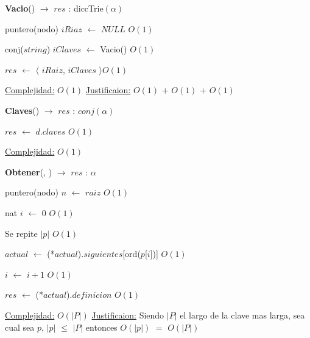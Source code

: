 \begin{Algoritmos}
  
  
\begin{algorithm}[H]
{\textbf{Vacio}() $\to$ $res$ : diccTrie$(\alpha)$}
\begin{algorithmic}[1]

\State puntero(nodo) $iRiaz$ $\gets $ $NULL$  \Comment $O(1)$
 
\State conj($string$) $iClaves$ $\gets$ Vacio() \Comment $O(1)$

\State $res$ $\gets$  $\langle$ $iRaiz$, $iClaves$ $\rangle$\Comment $O(1)$

\medskip
\State \underline{Complejidad:} $O(1)$
\State \underline{Justificaion:} $O(1)$ $+$ $O(1)$ $+$ $O(1)$

\end{algorithmic}
\end{algorithm}  

\begin{algorithm}[H]
{\textbf{Claves}(}) $\to$ $res$ : $conj(\alpha)$
\begin{algorithmic}[1]

\State $res$ $\gets$ $d$.$claves$ \Comment $O(1)$

\medskip
\State \underline{Complejidad:} $O(1)$

\end{algorithmic}
\end{algorithm}
  
  
  
\begin{algorithm}[H]
{\textbf{Obtener}(, }) $\to$ $res$ : $\alpha$
\begin{algorithmic}[1]

\State puntero(nodo) $n$ $\gets$ $raiz$ \Comment $O(1)$

\State nat $i$ $\gets$ $0$ \Comment $O(1)$


   \Comment Se repite $|p|$ $O(1)$
		

	\State $actual$ $\gets$ (*$actual$).$siguientes$[ord($p$[$i$])] \Comment $O(1)$

	\State $i$ $\gets$ $i + 1$ \Comment $O(1)$
\EndWhile 


\State $res$ $\gets$ (*$actual$).$definicion$ \Comment $O(1)$ 

\medskip
\State \underline{Complejidad:} $O(|P|)$
\State \underline{Justificaion:} Siendo $|P|$ el largo de la clave mas larga, sea cual sea $p$, $|p|$ $\leq$ $|P|$ entonces 	$O(|p|)$ $=$ $O(|P|)$


\end{algorithmic}
\end{algorithm}
\end{Algoritmos}
